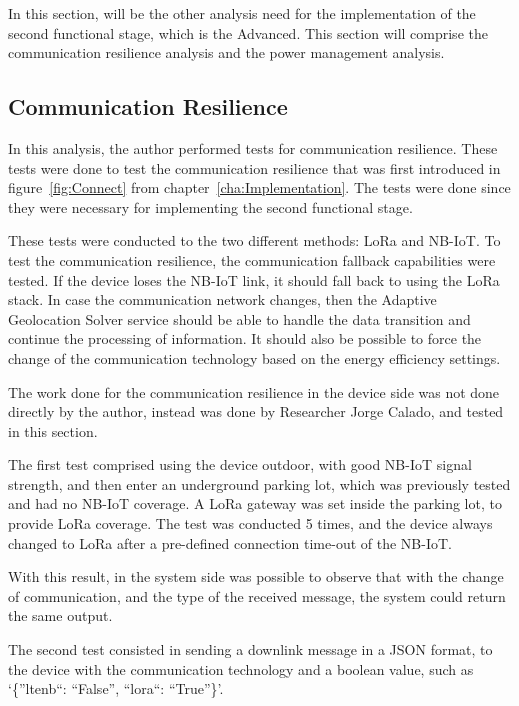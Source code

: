 In this section, will be the other analysis  need for the implementation of the  second functional stage, which is the Advanced. This section will comprise the communication resilience analysis and the power management analysis.


\subsection{Communication Resilience}
\label{sec:Comunication_Resilience}

In this analysis, the author performed tests for communication resilience. These tests were done to test the communication resilience that was first introduced in figure~\ref{fig:Connect} from chapter~\ref{cha:Implementation}. The tests were done since they were necessary for implementing the second functional stage.

These tests were conducted to the two different methods: LoRa and NB-IoT. To test the communication resilience, the communication fallback capabilities were tested. If the device loses the NB-IoT link, it should fall back to using the LoRa stack.
In case the communication network changes, then the Adaptive Geolocation Solver service should be able to handle the data transition and continue the processing of information. It should also be possible to force the change of the communication technology based on the energy efficiency settings.



The work done for the communication resilience in the device side was not done directly by the author, instead was done by Researcher Jorge Calado, and tested in this section.

The first test comprised using the device outdoor, with good NB-IoT signal strength, and then enter an underground parking lot, which was previously tested and had no NB-IoT coverage. A LoRa gateway was set inside the parking lot, to provide LoRa coverage. The test was conducted 5 times, and the device always changed to LoRa after a pre-defined connection time-out of the NB-IoT.

With this result, in the system side was possible to observe that with the change of communication, and the type of the received message, the system could return the same output.

The second test consisted in sending a downlink message in a JSON format, to the device with the communication technology and a boolean value, such as ‘\{”ltenb“: “False”, “lora“: “True”\}’. 

